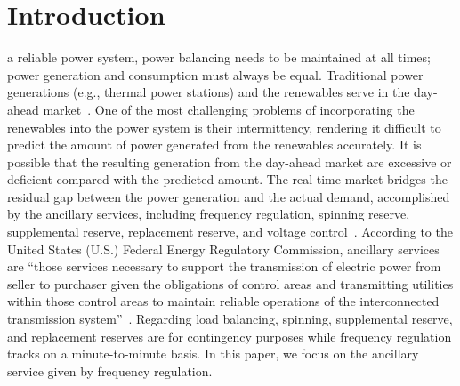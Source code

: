 \documentclass[journal]{IEEEtran}
\begin{document}
\IEEEpeerreviewmaketitle


\section{Introduction}

a reliable power system, power balancing needs to be maintained at all
times; power generation and consumption must always be equal.  
Traditional power generations (e.g., thermal power stations) and the renewables serve in
the day-ahead market~\cite{CA2011energy}.  One of the most
challenging problems of incorporating the renewables into the power system is
their intermittency, rendering it difficult to predict the amount of power
generated from the renewables accurately.  It is possible that the resulting
generation from the day-ahead market are excessive or deficient
compared with the predicted amount.  The real-time market bridges the residual gap
between the power generation and the actual demand, accomplished by
the ancillary services, including frequency regulation, spinning reserve,
supplemental reserve, replacement reserve, and voltage
control~\cite{frequencyregulation}.  According to the United States (U.S.)
Federal Energy
Regulatory Commission, ancillary services are ``those services necessary to
support the transmission of electric power from seller to purchaser given the
obligations of control areas and transmitting utilities within those control
areas to maintain reliable operations of the interconnected transmission
system''~\cite{FERC}.  Regarding load balancing, spinning, supplemental
reserve, and replacement reserves are for contingency purposes while frequency
regulation tracks on a minute-to-minute basis.  In this paper, we
focus on the ancillary service given by frequency regulation.
\end{document}
